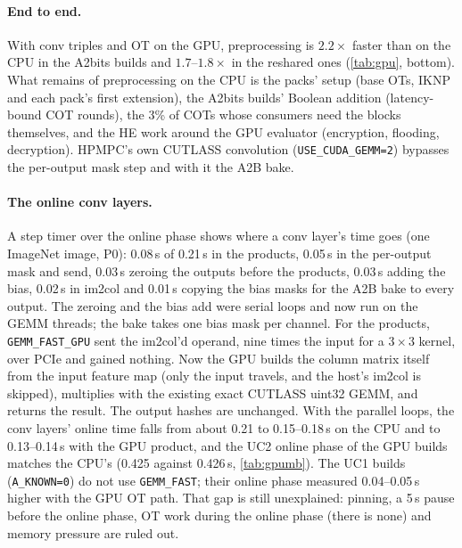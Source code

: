 \documentclass[10pt,a4paper]{article}
\newcommand{\flag}[1]{\nolinkurl{#1}}
\newcommand{\s}{\,s\xspace}
\begin{document}
\paragraph{End to end.} With conv triples and OT on the GPU, preprocessing is $2.2\times$ faster than on the CPU in the
A2bits builds and $1.7$--$1.8\times$ in the reshared ones (\cref{tab:gpu}, bottom). What remains of preprocessing on the
CPU is the packs' setup (base OTs, IKNP and each pack's first extension), the A2bits builds' Boolean addition
(latency-bound COT rounds), the 3\% of COTs whose consumers need the blocks themselves, and the HE work around the GPU
evaluator (encryption, flooding, decryption). HPMPC's own CUTLASS convolution (\flag{USE_CUDA_GEMM=2}) bypasses the
per-output mask step and with it the A2B bake.

\paragraph{The online conv layers.} A step timer over the online phase shows where a conv layer's time goes (one
ImageNet image, P0): 0.08\s of 0.21\s in the products, 0.05\s in the per-output mask and send, 0.03\s zeroing the outputs
before the products, 0.03\s adding the bias, 0.02\s in im2col and 0.01\s copying the bias masks for the A2B bake to every
output. The zeroing and the bias add were serial loops and now run on the GEMM threads; the bake takes one bias mask per
channel. For the products, \flag{GEMM_FAST_GPU} sent the im2col'd operand, nine times the input for a $3\times3$ kernel,
over PCIe and gained nothing. Now the GPU builds the column matrix itself from the input feature map (only the input
travels, and the host's im2col is skipped), multiplies with the existing exact CUTLASS uint32 GEMM, and returns the
result. The output hashes are unchanged. With the parallel loops, the conv layers' online time falls from about 0.21 to
0.15--0.18\s on the CPU and to 0.13--0.14\s with the GPU product, and the UC2 online phase of the GPU builds matches the
CPU's (0.425 against 0.426\s, \cref{tab:gpumb}). The UC1 builds (\flag{A_KNOWN=0}) do not use \flag{GEMM_FAST}; their online
phase measured 0.04--0.05\s higher with the GPU OT path. That gap is still unexplained: pinning, a 5\,s pause before the
online phase, OT work during the online phase (there is none) and memory pressure are ruled out.
\end{document}
